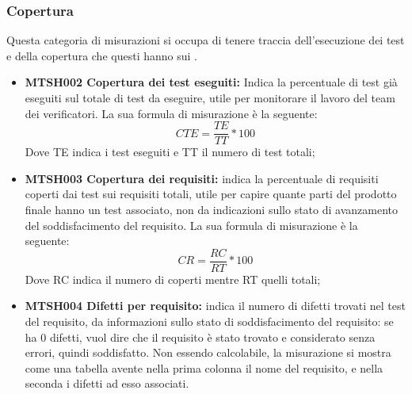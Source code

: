 \documentclass[NormeDiProgetto.tex]{subfiles}
\begin{document}
\subsubsection{Copertura}
Questa categoria di misurazioni si occupa di tenere traccia dell'esecuzione dei test e della copertura che questi hanno sui .
\begin{itemize}
	\item \textbf{MTSH002 Copertura dei test eseguiti:} Indica la percentuale di test già eseguiti sul totale di test da eseguire, utile per monitorare il lavoro del team dei verificatori. La sua formula di misurazione è la seguente:
	\[CTE=\dfrac{TE}{TT}*100\]
	Dove TE indica i test eseguiti e TT il numero di test totali;
	\item \textbf{MTSH003 Copertura dei requisiti:} indica la percentuale di requisiti coperti dai test sui requisiti totali, utile per capire quante parti del prodotto finale hanno un test associato, non da indicazioni sullo stato di avanzamento del soddisfacimento del requisito. La sua formula di misurazione è la seguente:
	\[CR=\dfrac{RC}{RT}*100\]
	Dove RC indica il numero di  coperti mentre RT quelli totali;
	\item \textbf{MTSH004 Difetti per requisito:} indica il numero di difetti trovati nel test del requisito, da informazioni sullo stato di soddisfacimento del requisito: se ha 0 difetti, vuol dire che il requisito è stato trovato e considerato senza errori, quindi soddisfatto.
	Non essendo calcolabile, la misurazione si mostra come una tabella avente nella prima colonna il nome del requisito, e nella seconda i difetti ad esso associati.
\end{itemize}
\begin{comment}
\paragraph{Efficacia dei cambiamenti}
\begin{itemize}
\item \textlink{MTSH005TAB}{MTSH005}{\textbf{MTSH005 Tasso di iniezione dei difetti:}} Indica il tasso di errori attribuibili all'introduzione di una modifica, la conoscenza di questo numero aiuta a stimare il tempo medio per la scoperta e correzione di errori introdotti dalle modifiche, aiutando la stima dei costi per l'introduzione di nuove funzionalità
\[TID=\dfrac{NM}{NDM}\]
Dove NM indica il numero di modifiche e NDM i difetti attribuibili ad esse.
\end{itemize}
\end{comment}
\end{document}
